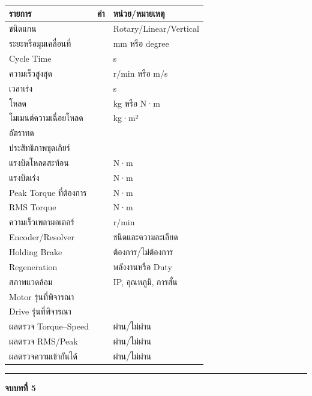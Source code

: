 \begin{table}[htbp]
    \centering
    \begin{tabular}{l r l}
        \hline
        \textbf{รายการ} & \textbf{ค่า} & \textbf{หน่วย/หมายเหตุ} \\
        \hline
        ชนิดแกน &  & Rotary/Linear/Vertical \\
        ระยะหรือมุมเคลื่อนที่ &  & mm หรือ degree \\
        Cycle Time &  & s \\
        ความเร็วสูงสุด &  & r/min หรือ m/s \\
        เวลาเร่ง &  & s \\
        โหลด &  & kg หรือ N·m \\
        โมเมนต์ความเฉื่อยโหลด &  & kg·m² \\
        อัตราทด &  &  \\
        ประสิทธิภาพชุดเกียร์ &  &  \\
        แรงบิดโหลดสะท้อน &  & N·m \\
        แรงบิดเร่ง &  & N·m \\
        Peak Torque ที่ต้องการ &  & N·m \\
        RMS Torque &  & N·m \\
        ความเร็วเพลามอเตอร์ &  & r/min \\
        Encoder/Resolver &  & ชนิดและความละเอียด \\
        Holding Brake &  & ต้องการ/ไม่ต้องการ \\
        Regeneration &  & พลังงานหรือ Duty \\
        สภาพแวดล้อม &  & IP, อุณหภูมิ, การสั่น \\
        Motor รุ่นที่พิจารณา &  &  \\
        Drive รุ่นที่พิจารณา &  &  \\
        ผลตรวจ Torque–Speed &  & ผ่าน/ไม่ผ่าน \\
        ผลตรวจ RMS/Peak &  & ผ่าน/ไม่ผ่าน \\
        ผลตรวจความเข้ากันได้ &  & ผ่าน/ไม่ผ่าน \\
        \hline
    \end{tabular}
\end{table}

\par\noindent\rule{\textwidth}{0.4pt}\par

\textbf{จบบทที่ 5}
